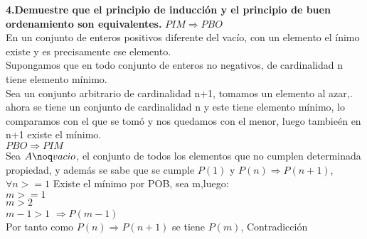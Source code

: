 \documentclass[12pt,a4paper]{article}
\begin{document}
\textbf{4.Demuestre que el principio de inducción y el principio de buen ordenamiento son equivalentes.}
$PIM \Rightarrow PBO$\\
En un conjunto de enteros positivos diferente del vac\'io, con un elemento el \'inimo existe y es precisamente ese elemento.\\
Supongamos que en todo conjunto de enteros no negativos, de cardinalidad n tiene elemento m\'inimo.\\
Sea un conjunto arbitrario de cardinalidad n+1, tomamos un elemento al azar,. ahora se tiene un conjunto de cardinalidad n y este tiene elemento m\'inimo, lo comparamos con el que se tom\'o y nos quedamos con el menor, luego tambie\'en en n+1 existe el m\'inimo.\\
$PBO \Rightarrow PIM$\\
Sea $A \noq vacio$, el conjunto de todos los elementos que no cumplen determinada propiedad, y adem\'as se sabe que se cumple $P(1)$ y $P(n)\Rightarrow P(n+1)$, $\forall n>=1$
Existe el m\'inimo por POB, sea m,luego:\\
$m>=1$\\
$m>2$\\
$m-1>1$
$\Rightarrow P(m-1)$\\
Por tanto como $P(n)\Rightarrow P(n+1)$ se tiene $P(m)$, Contradicci\'on
 
\end{document}
